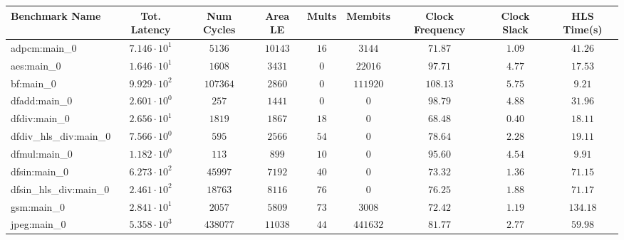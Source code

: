 \begin{tabular}{|l|c|c|c|c|c|c|c|c|}
\hline
Benchmark Name          & Tot. Latency           & Num Cycles & Area LE   & Mults   & Membits    & Clock Frequency & Clock Slack & HLS Time(s) \\
\hline
adpcm:main\_0           & $ 7.146 \cdot 10^{1} $ & $ 5136   $ & $ 10143 $ & $ 16  $ & $ 3144   $ & $ 71.87       $ & $ 1.09    $ & $ 41.26   $ \\
aes:main\_0             & $ 1.646 \cdot 10^{1} $ & $ 1608   $ & $ 3431  $ & $ 0   $ & $ 22016  $ & $ 97.71       $ & $ 4.77    $ & $ 17.53   $ \\
bf:main\_0              & $ 9.929 \cdot 10^{2} $ & $ 107364 $ & $ 2860  $ & $ 0   $ & $ 111920 $ & $ 108.13      $ & $ 5.75    $ & $ 9.21    $ \\
dfadd:main\_0           & $ 2.601 \cdot 10^{0} $ & $ 257    $ & $ 1441  $ & $ 0   $ & $ 0      $ & $ 98.79       $ & $ 4.88    $ & $ 31.96   $ \\
dfdiv:main\_0           & $ 2.656 \cdot 10^{1} $ & $ 1819   $ & $ 1867  $ & $ 18  $ & $ 0      $ & $ 68.48       $ & $ 0.40    $ & $ 18.11   $ \\
dfdiv\_hls\_div:main\_0 & $ 7.566 \cdot 10^{0} $ & $ 595    $ & $ 2566  $ & $ 54  $ & $ 0      $ & $ 78.64       $ & $ 2.28    $ & $ 19.11   $ \\
dfmul:main\_0           & $ 1.182 \cdot 10^{0} $ & $ 113    $ & $ 899   $ & $ 10  $ & $ 0      $ & $ 95.60       $ & $ 4.54    $ & $ 9.91    $ \\
dfsin:main\_0           & $ 6.273 \cdot 10^{2} $ & $ 45997  $ & $ 7192  $ & $ 40  $ & $ 0      $ & $ 73.32       $ & $ 1.36    $ & $ 71.15   $ \\
dfsin\_hls\_div:main\_0 & $ 2.461 \cdot 10^{2} $ & $ 18763  $ & $ 8116  $ & $ 76  $ & $ 0      $ & $ 76.25       $ & $ 1.88    $ & $ 71.17   $ \\
gsm:main\_0             & $ 2.841 \cdot 10^{1} $ & $ 2057   $ & $ 5809  $ & $ 73  $ & $ 3008   $ & $ 72.42       $ & $ 1.19    $ & $ 134.18  $ \\
jpeg:main\_0            & $ 5.358 \cdot 10^{3} $ & $ 438077 $ & $ 11038 $ & $ 44  $ & $ 441632 $ & $ 81.77       $ & $ 2.77    $ & $ 59.98   $ \\

\end{tabular}
